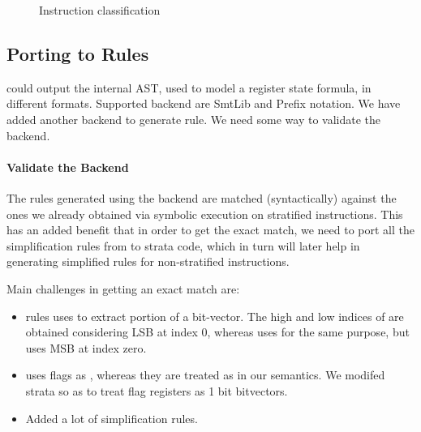 \begin{figure*}[t]
\centering
{}
\caption{Instruction classification\label{fig:instr_class}}
\end{figure*}

\subsection{Porting to \K Rules}

\Strata could output the internal AST, used to model a register state formula, in different
formats. Supported backend are SmtLib and Prefix notation. We have added another backend 
to generate \K rule. We need some way to validate the backend. 

\paragraph{Validate the Backend}

The \K rules generated using the backend are matched (syntactically)  against
the ones we already obtained via symbolic execution on stratified instructions.
This has an added benefit that in order to get the exact match, we need to port
all the simplification rules from \K to strata code, which in turn will later
help in generating simplified \K rules for non-stratified instructions. 

Main challenges in getting an exact match are:
\begin{itemize}

\item  \Strata rules uses \extract to extract portion of a bit-vector. The high
and low indices of \extract are obtained considering LSB at index 0, whereas \K
uses \extractMInt for the same purpose, but uses MSB at index zero.

\item  \Strata uses flags as \bool, whereas they are treated as \bv in our
semantics. We modifed strata so as to treat flag registers as 1 bit bitvectors.

\item Added a lot of simplification rules.

\end{itemize}


